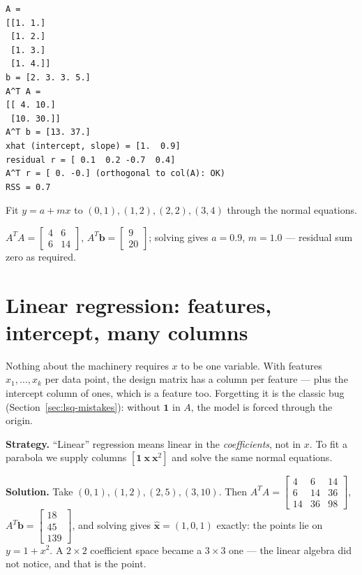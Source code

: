 \begin{lstlisting}[caption={Output of the normal-equations solve. Notice
the residual is orthogonal to BOTH columns --- sums to zero and is
uncorrelated with $x$ --- which is the normal-equations condition
$A^{T}\mathbf r=\mathbf0$ in numbers.}]
A =
[[1. 1.]
 [1. 2.]
 [1. 3.]
 [1. 4.]]
b = [2. 3. 3. 5.]
A^T A =
[[ 4. 10.]
 [10. 30.]]
A^T b = [13. 37.]
xhat (intercept, slope) = [1.  0.9]
residual r = [ 0.1  0.2 -0.7  0.4]
A^T r = [ 0. -0.] (orthogonal to col(A): OK)
RSS = 0.7
\end{lstlisting}

\begin{exercise}[easy]
Fit $y=a+mx$ to $(0,1),(1,2),(2,2),(3,4)$ through the normal equations.
\begin{solution}
$A^{T}A=\begin{bmatrix}4&6\\6&14\end{bmatrix}$,
$A^{T}\mathbf b=\begin{bmatrix}9\\20\end{bmatrix}$; solving gives
$a=0.9$, $m=1.0$ --- residual sum zero as required.
\end{solution}
\end{exercise}

\section{Linear regression: features, intercept, many columns}\label{sec:lstsq-reg}

Nothing about the machinery requires $x$ to be one variable. With
features $x_1,\dots,x_k$ per data point, the design matrix has a column
per feature --- plus the intercept column of ones, which is a feature too.
Forgetting it is the classic bug (Section~\ref{sec:lsq-mistakes}): without
$\mathbf 1$ in $A$, the model is forced through the origin.

\begin{example}\label{ex:quadmap}
\textbf{Strategy.} ``Linear'' regression means linear in the
\emph{coefficients}, not in $x$. To fit a parabola we supply columns
$[\mathbf1\ \mathbf x\ \mathbf x^{2}]$ and solve the same normal
equations.

\textbf{Solution.} Take $(0,1),(1,2),(2,5),(3,10)$. Then
$A^{T}A=\begin{bmatrix}4&6&14\\6&14&36\\14&36&98\end{bmatrix}$,
$A^{T}\mathbf b=\begin{bmatrix}18\\45\\139\end{bmatrix}$, and solving gives
$\hat{\mathbf x}=(1,0,1)$ exactly: the points lie on $y=1+x^{2}$.
A $2\times2$ coefficient space became a $3\times3$ one --- the linear
algebra did not notice, and that is the point.
\end{example}

